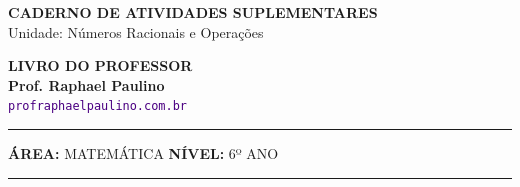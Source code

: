 \usepackage{titlesec}
\titleformat{\section}{\color{black}\large\bfseries}{\thesection}{0em}{\vspace{0.1cm}\titlerule[0.8pt]}
\titlespacing*{\section}{0pt}{10pt}{6pt} 
\titleformat{\subsubsection}[runin]{\color{black}\bfseries}{}{0em}{}
\titlespacing*{\subsubsection}{0pt}{0pt}{0.15cm}

\usepackage{multicol}
\setlength{\columnsep}{1cm}
\setlength{\columnseprule}{0.5pt}
\def\columnseprulecolor{\color{CorLinha}}
\usepackage{adjustbox, tikz, pgfplots, circuitikz}
\usetikzlibrary{shadows, shapes.misc, positioning, calc}
\pgfplotsset{compat=1.18}


\thispagestyle{empty}
\color{Cinzablack}
\vspace*{-1.8cm}

\noindent
\begin{minipage}{\textwidth}
    \selectfont
    \noindent
    \begin{minipage}[t]{0.65\linewidth}
        {\Large \bfseries \MakeUppercase{Caderno de Atividades Suplementares}}\\[0.1cm]
        {\large \textmd{\textcolor{CinzaEscuro}{Unidade: Números Racionais e Operações}}}
    \end{minipage}%
    \begin{minipage}[t]{0.35\linewidth}
        \raggedleft
        \ifgabarito
            {\large \bfseries \textcolor{CorTitUm}{LIVRO DO PROFESSOR}}\\[0.05cm]
        \fi
        \small \textbf{Prof. Raphael Paulino}\\
        \textsf{\small \textcolor{indigo}{\texttt{profraphaelpaulino.com.br}}}
    \end{minipage}
    
    \vspace{0.15cm}
    \noindent\rule{\linewidth}{1.2pt}
    \vspace{-0.1cm}
    \footnotesize\textsf{\textbf{ÁREA:} MATEMÁTICA \hfill \textbf{NÍVEL:} 6º ANO}
    \vspace{0.1cm}
    \noindent\rule{\linewidth}{0.4pt}
\end{minipage}

